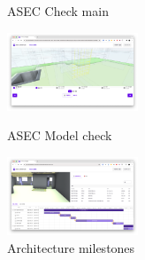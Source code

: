 \begin{figure}[!ht]
\begin{fullwidth}
{			\caption*{ASEC Check main}
		}\qquad
		\parbox{0.35\textwidth}{
			\centering
			\includegraphics[width=0.35\textwidth]{images/builderhub-supervision-asec-model-check.png}
			\caption*{ASEC Model check}
		}\qquad
		\parbox{0.35\textwidth}{
			\centering
			\includegraphics[width=0.35\textwidth]{images/builderhub-supervision-archi-gantt.png}
			\caption*{Architecture milestones}
		}
	\end{fullwidth}
\end{figure}
